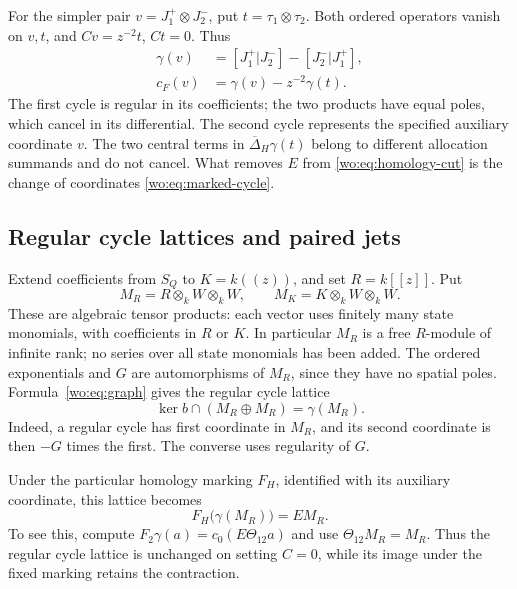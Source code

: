 For the simpler pair \(v=J_1^+\otimes J_2^-\), put
\(t=\tau_1\otimes\tau_2\).  Both ordered operators vanish on
\(v,t\), and \(Cv=z^{-2}t\), \(Ct=0\).  Thus
\begin{equation}\label{wo:eq:current-marking}
 \begin{split}
 \gamma(v)&=[J_1^+|J_2^-]-[J_2^-|J_1^+],\\
 c_F(v)&=\gamma(v)-z^{-2}\gamma(t).
 \end{split}
\end{equation}
The first cycle is regular in its coefficients; the two products
have equal poles, which cancel in its differential.  The second
cycle represents the specified auxiliary coordinate \(v\).
The two central terms in \(\overline\Delta_H\gamma(t)\) belong
to different allocation summands and do not cancel.  What removes
\(E\) from \eqref{wo:eq:homology-cut} is the change of coordinates
\eqref{wo:eq:marked-cycle}.

\subsection{Regular cycle lattices and paired jets}

Extend coefficients from \(S_Q\) to
\(K=k((z))\), and set \(R=k[[z]]\).  Put
\[
 M_R=R\otimes_k W\otimes_k W,\qquad
 M_K=K\otimes_k W\otimes_k W.
\]
These are algebraic tensor products: each vector uses finitely many
state monomials, with coefficients in \(R\) or \(K\).
In particular \(M_R\) is a free \(R\)-module of infinite rank;
no series over all state monomials has been added.
The ordered exponentials and \(G\) are automorphisms of \(M_R\),
since they have no spatial poles.  Formula~\eqref{wo:eq:graph} gives
the regular cycle lattice
\begin{equation}\label{wo:eq:cycle-lattice}
 \ker b\cap(M_R\oplus M_R)=\gamma(M_R).
\end{equation}
Indeed, a regular cycle has first coordinate in \(M_R\), and its
second coordinate is then \(-G\) times the first.  The converse
uses regularity of \(G\).

Under the particular homology marking \(F_H\), identified with
its auxiliary coordinate, this lattice becomes
\begin{equation}\label{wo:eq:marked-lattice}
 F_H\bigl(\gamma(M_R)\bigr)=E M_R.
\end{equation}
To see this, compute
\(F_2\gamma(a)=c_0(E\Theta_{12}a)\) and use
\(\Theta_{12}M_R=M_R\).  Thus the regular cycle lattice is
unchanged on setting \(C=0\), while its image under the fixed
marking retains the contraction.


